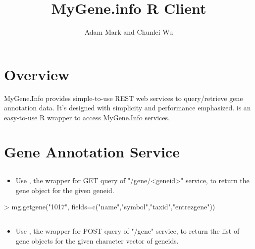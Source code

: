 \documentclass[12pt]{article}
\title{MyGene.info R Client}
\author{Adam Mark and Chunlei Wu}
\begin{document}


\maketitle

\tableofcontents

\section{Overview}

MyGene.Info provides simple-to-use REST web services to query/retrieve gene annotation data. It's designed with simplicity and performance emphasized.  is an easy-to-use R wrapper to access MyGene.Info services.
\section{Gene Annotation Service}

\subsection{}

\begin{itemize}
\item Use , the wrapper for GET query of "/gene/<geneid>" service, to return the gene object for the given geneid.
\end{itemize} 


\begin{Schunk}
\begin{Sinput}
> mg.getgene("1017", fields=c("name","symbol","taxid","entrezgene"))
\end{Sinput}
\end{Schunk}

\subsection{}

\begin{itemize}
\item Use , the wrapper for POST query of "/gene" service, to return the list of gene objects for the given character vector of geneids.
\end{itemize} 
\end{document}
